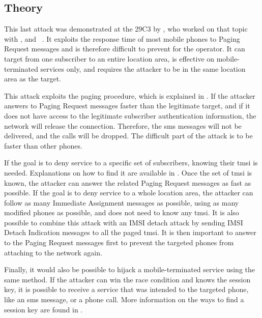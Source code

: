       \subsection{Theory}

      This last attack was demonstrated at the 29C3 by , who worked on that topic with , and
      ~\cite{golde_let_2013,golde_let_2012}.
      It exploits the response time of most mobile phones to Paging
      Request messages and is therefore difficult to prevent for the
      operator. It can target from one subscriber to an entire location
      area, is effective on mobile-terminated services only, and
      requires the attacker to be in the same location area as the
      target.

      This attack exploits the paging procedure, which is explained in
      . If the attacker answers to Paging Request
      messages faster than the legitimate target, and if it does not
      have access to the legitimate subscriber authentication
      information, the network will release the connection. Therefore,
      the \gls{sms} messages will not be delivered, and the calls will
      be dropped. The difficult part of the attack is to be faster than
      other phones.

      If the goal is to deny service to a specific set of subscribers,
      knowing their \gls{tmsi} is needed. Explanations on how to find it
      are available in . Once the set of
      \gls{tmsi} is known, the attacker can answer the related Paging
      Request messages as fast as possible. If the goal is to deny
      service to a whole location area, the attacker can follow as many
      Immediate Assignment messages as possible, using as many modified
      phones as possible, and does not need to know any \gls{tmsi}. It
      is also possible to combine this attack with an IMSI detach attack
      by sending IMSI Detach Indication messages to all the paged
      \gls{tmsi}. It is then important to answer to the Paging Request
      messages first to prevent the targeted phones from attaching to the
      network again.

      Finally, it would also be possible to hijack a mobile-terminated
      service using the same method. If the attacker can win the race
      condition and knows the session key, it is possible to receive a
      service that was intended to the targeted phone, like an \gls{sms}
      message, or a phone call. More information on the ways to find a
      session key are found in .


